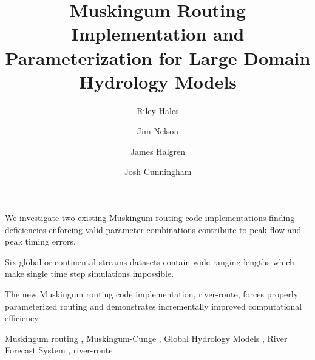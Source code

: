 \begin{frontmatter}
  \title{Muskingum Routing Implementation and Parameterization for Large Domain Hydrology Models}

  \author[a]{Riley Hales}
  \author[a]{Jim Nelson}
  \author[a]{James Halgren}
  \author[b]{Josh Cunningham}

  \begin{highlights}
    \item{We investigate two existing Muskingum routing code implementations finding deficiencies enforcing valid parameter combinations contribute to peak flow and peak timing errors.}
    \item{Six global or continental streams datasets contain wide-ranging lengths which make single time step simulations impossible.}
    \item{The new Muskingum routing code implementation, river-route, forces properly parameterized routing and demonstrates incrementally improved computational efficiency.}
  \end{highlights}

  \begin{abstract}

  \end{abstract}

  \begin{keyword}
    Muskingum routing \sep
    Muskingum-Cunge \sep
    Global Hydrology Models \sep
    River Forecast System \sep
    river-route
  \end{keyword}

\end{frontmatter}
\clearpage
